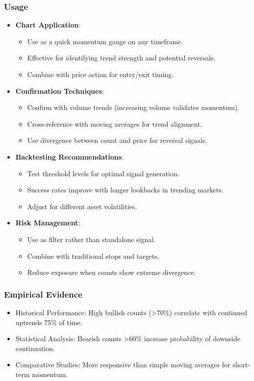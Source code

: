 \documentclass[12pt]{article}
\begin{document}
\subsubsection{Usage}
\begin{itemize}
\item \textbf{Chart Application}:
  \begin{itemize}
  \item Use as a quick momentum gauge on any timeframe.
  \item Effective for identifying trend strength and potential reversals.
  \item Combine with price action for entry/exit timing.
  \end{itemize}
\item \textbf{Confirmation Techniques}:
  \begin{itemize}
  \item Confirm with volume trends (increasing volume validates momentum).
  \item Cross-reference with moving averages for trend alignment.
  \item Use divergence between count and price for reversal signals.
  \end{itemize}
\item \textbf{Backtesting Recommendations}:
  \begin{itemize}
  \item Test threshold levels for optimal signal generation.
  \item Success rates improve with longer lookbacks in trending markets.
  \item Adjust for different asset volatilities.
  \end{itemize}
\item \textbf{Risk Management}:
  \begin{itemize}
  \item Use as filter rather than standalone signal.
  \item Combine with traditional stops and targets.
  \item Reduce exposure when counts show extreme divergence.
  \end{itemize}
\end{itemize}

\subsubsection{Empirical Evidence}
\begin{itemize}
\item Historical Performance: High bullish counts (>70\%) correlate with continued uptrends 75\% of time.
\item Statistical Analysis: Bearish counts >60\% increase probability of downside continuation.
\item Comparative Studies: More responsive than simple moving averages for short-term momentum.
\end{itemize}
\end{document}
